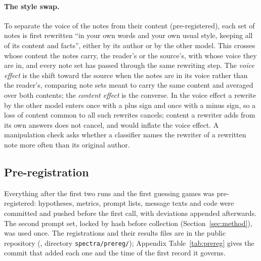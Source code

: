\documentclass[11pt]{article}
\begin{document}
\paragraph{The style swap.}
To separate the voice of the notes from their content (pre-registered), each set of notes is first rewritten ``in your own words and your own usual style, keeping all of its content and facts'', either by its author or by the other model.
This crosses whose content the notes carry, the reader's or the source's, with whose voice they are in, and every note set has passed through the same rewriting step.
The \emph{voice effect} is the shift toward the source when the notes are in its voice rather than the reader's, comparing note sets meant to carry the same content and averaged over both contents; the \emph{content effect} is the converse.
In the voice effect a rewrite by the other model enters once with a plus sign and once with a minus sign, so a loss of content common to all such rewrites cancels; content a rewriter adds from its own answers does not cancel, and would inflate the voice effect.
A manipulation check asks whether a classifier names the rewriter of a rewritten note more often than its original author.

\subsection{Pre-registration}
\label{sec:prereg}
Everything after the first two runs and the first guessing games was pre-registered: hypotheses, metrics, prompt lists, message texts and code were committed and pushed before the first call, with deviations appended afterwards.
The second prompt set, locked by hash before collection (Section~\ref{sec:method}), was used once.
The registrations and their results files are in the public repository (\repoLink, directory \texttt{spectra/prereg/}); Appendix Table~\ref{tab:prereg} gives the commit that added each one and the time of the first record it governs.

\end{document}
